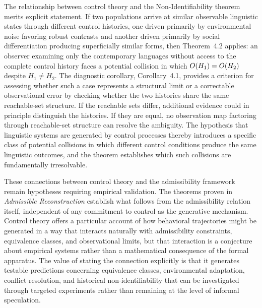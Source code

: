 The relationship between control theory and the Non-Identifiability theorem merits explicit statement. If two populations arrive at similar observable linguistic states through different control histories, one driven primarily by environmental noise favoring robust contrasts and another driven primarily by social differentiation producing superficially similar forms, then Theorem~4.2 applies: an observer examining only the contemporary languages without access to the complete control history faces a potential collision in which $O(H_1) = O(H_2)$ despite $H_1 \neq H_2$. The diagnostic corollary, Corollary~4.1, provides a criterion for assessing whether such a case represents a structural limit or a correctable observational error by checking whether the two histories share the same reachable-set structure. If the reachable sets differ, additional evidence could in principle distinguish the histories. If they are equal, no observation map factoring through reachable-set structure can resolve the ambiguity. The hypothesis that linguistic systems are generated by control processes thereby introduces a specific class of potential collisions in which different control conditions produce the same linguistic outcomes, and the theorem establishes which such collisions are fundamentally irresolvable.

These connections between control theory and the admissibility framework remain hypotheses requiring empirical validation. The theorems proven in \emph{Admissible Reconstruction} establish what follows from the admissibility relation itself, independent of any commitment to control as the generative mechanism. Control theory offers a particular account of how behavioral trajectories might be generated in a way that interacts naturally with admissibility constraints, equivalence classes, and observational limits, but that interaction is a conjecture about empirical systems rather than a mathematical consequence of the formal apparatus. The value of stating the connection explicitly is that it generates testable predictions concerning equivalence classes, environmental adaptation, conflict resolution, and historical non-identifiability that can be investigated through targeted experiments rather than remaining at the level of informal speculation.
